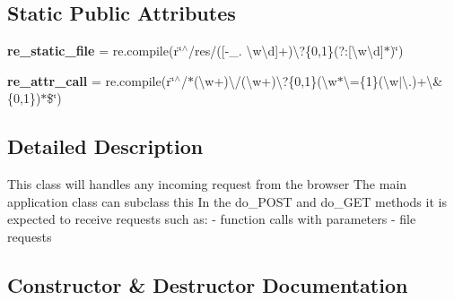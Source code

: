 \subsection*{Static Public Attributes}
\begin{DoxyCompactItemize}
\item 
{\bfseries re\+\_\+static\+\_\+file} = re.\+compile(r\char`\"{}$^\wedge$/res/(\mbox{[}-\/\+\_\+. \textbackslash{}w\textbackslash{}d\mbox{]}+)\textbackslash{}?\{0,1\}(?\+:\mbox{[}\textbackslash{}w\textbackslash{}d\mbox{]}$\ast$)\char`\"{})\hypertarget{classremi_1_1server_1_1App_abc92ea16b9ac89f8fd685cc9dec90a8d}{}\label{classremi_1_1server_1_1App_abc92ea16b9ac89f8fd685cc9dec90a8d}

\item 
{\bfseries re\+\_\+attr\+\_\+call} = re.\+compile(r\char`\"{}$^\wedge$/$\ast$(\textbackslash{}w+)\textbackslash{}/(\textbackslash{}w+)\textbackslash{}?\{0,1\}(\textbackslash{}w$\ast$\textbackslash{}=\{1\}(\textbackslash{}w$\vert$\textbackslash{}.)+\textbackslash{}\&\{0,1\})$\ast$\$\char`\"{})\hypertarget{classremi_1_1server_1_1App_acef1a66b528b10e2a928d1a1f3f2b0f5}{}\label{classremi_1_1server_1_1App_acef1a66b528b10e2a928d1a1f3f2b0f5}

\end{DoxyCompactItemize}


\subsection{Detailed Description}
\begin{DoxyVerb}This class will handles any incoming request from the browser
The main application class can subclass this
In the do_POST and do_GET methods it is expected to receive requests such as:
    - function calls with parameters
    - file requests
\end{DoxyVerb}
 

\subsection{Constructor \& Destructor Documentation}
